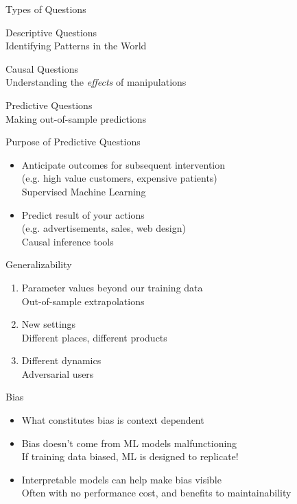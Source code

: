 \documentclass[11pt]{beamer}
\begin{document}
\begin{frame}[c]{Types of Questions}
  \begin{enumerate}
    {\color{gray} \item {Descriptive Questions} \\
    {\color{gray} Identifying Patterns in the World} 
    \item \alert{Causal Questions} \\
    {\color{gray} Understanding the \emph{effects} of manipulations}}
    \color{gray} \item Predictive Questions \\
    {\color{gray} Making out-of-sample predictions}
  \end{enumerate}
\end{frame}



\begin{frame}[c]{Purpose of Predictive Questions}
\begin{itemize}
  \pause \item Anticipate outcomes for subsequent intervention \\
  (e.g. high value customers, expensive patients) \\
  {\color{gray} Supervised Machine Learning}
  \pause \item Predict result of your actions \\
  (e.g. advertisements, sales, web design) \\
  {\color{gray} Causal inference tools} 
\end{itemize}
\end{frame}

\begin{frame}[c]{Generalizability}
\begin{enumerate}
  \pause \item Parameter values beyond our training data \\
  {\color{gray} Out-of-sample extrapolations}
  \pause \item New settings \\
  {\color{gray} Different places, different products}
  \pause \item Different dynamics \\
  {\color{gray} Adversarial users}
\end{enumerate}
\end{frame}

\begin{frame}[c]{Bias}
\begin{itemize}
  \item What constitutes bias is context dependent
  \pause \item Bias doesn't come from ML models malfunctioning \\
  {\color{gray} If training data biased, ML is designed to replicate!} 
  \pause \item Interpretable models can help make bias visible \\
  {\color{gray} Often with no performance cost, and benefits to maintainability} 
\end{itemize}
\end{frame}
\end{document}
